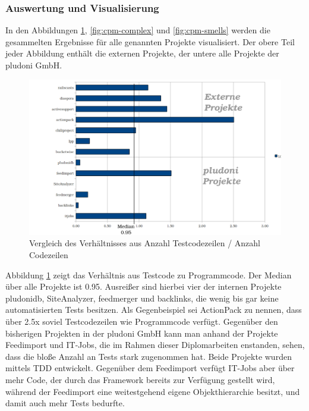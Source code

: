 \subsubsection{Auswertung und Visualisierung}
In den Abbildungen \ref{fig:cpm-loclot}, \ref{fig:cpm-complex} und \ref{fig:cpm-smells} werden die gesammelten Ergebnisse für alle genannten Projekte visualisiert. Der obere Teil jeder Abbildung enthält die externen Projekte, der untere alle Projekte der pludoni GmbH.
\begin{figure}[htbp]
 \centering
 \includegraphics[width=\linewidth]{./diagrams/cpm-lotloc.pdf}
 \caption{Vergleich des Verhältnisses aus Anzahl Testcodezeilen / Anzahl Codezeilen}
 \label{fig:cpm-loclot}
\end{figure}

Abbildung \ref{fig:cpm-loclot} zeigt das Verhältnis aus Testcode zu Programmcode. Der Median über alle Projekte ist 0.95. Ausreißer sind hierbei vier der internen Projekte pludonidb, SiteAnalyzer, feedmerger und backlinks, die wenig bis gar keine automatisierten  Tests besitzen. Als Gegenbeispiel sei ActionPack zu nennen, dass über 2.5x soviel Testcodezeilen wie Programmcode verfügt. Gegenüber den bisherigen Projekten in der pludoni GmbH kann man anhand der Projekte Feedimport und IT-Jobs, die im Rahmen dieser Diplomarbeiten enstanden, sehen, dass die bloße Anzahl an Tests stark zugenommen hat. Beide Projekte wurden mittels TDD entwickelt. Gegenüber dem Feedimport verfügt IT-Jobs aber über mehr Code, der durch das Framework bereits zur Verfügung gestellt wird, während der Feedimport eine weitestgehend eigene Objekthierarchie besitzt, und damit auch mehr Tests bedurfte.

